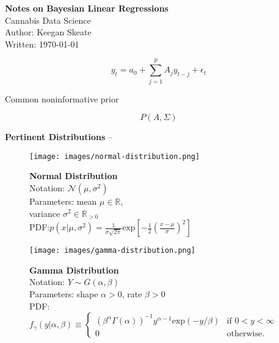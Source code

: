\documentclass[11pt]{article}
\begin{document}
\noindent\Large {\bfseries\LARGE Notes on Bayesian Linear Regressions}\\Cannabis Data Science\\ Author: Keegan Skeate\\Written: \medskip\today

\vspace{\baselineskip}

$$
y_t = a_0 + \sum_{j=1}^p A_j y_{t-j} + \epsilon_t
$$

Common noninformative prior

$$
P(A, \Sigma)
$$

{\bfseries Pertinent Distributions} -- 

\begin{minipage}{.45\textwidth}
\begin{figure}
\texttt{[image: images/normal-distribution.png]}
\caption*{%
  \scriptsize
  {\bfseries Normal Distribution}\\[.5\baselineskip]
  Notation: $\mathcal{N}(\mu, \sigma^2)$\\[.5\baselineskip]
  Parameters: mean $\mu \in \mathbb{R}$, \\variance $\sigma^2 \in \mathbb{R}_{>0}$\\[.5\baselineskip]
  PDF:$p(x | \mu, \sigma^2) = \frac{1}{\sigma\sqrt{2\pi}}\text{exp}\left[ -\frac{1}{2}\left( \frac{x - \mu}{\sigma} \right)^2 \right]
$
}
\end{figure}
\end{minipage}\hspace{.05\textwidth}%
\begin{minipage}{.45\textwidth}
\begin{figure}
\texttt{[image: images/gamma-distribution.png]}
\caption*{%
  \scriptsize
  {\bfseries Gamma Distribution}\\[.5\baselineskip]
  Notation: $Y \sim G(\alpha, \beta)$\\[.5\baselineskip]
  Parameters: shape $\alpha > 0$, rate $\beta > 0$\\[.5\baselineskip]
  PDF:$
  f_\gamma(y | \alpha, \beta ) \equiv   \begin{cases}
    (\beta^\alpha \Gamma(\alpha))^{-1} y^{\alpha - 1}\text{exp}(-y /\beta)& \text{if } 0 < y < \infty \\
    0 & \text{otherwise.}
\end{cases}$
}
\end{figure}
\end{minipage}
\end{document}
